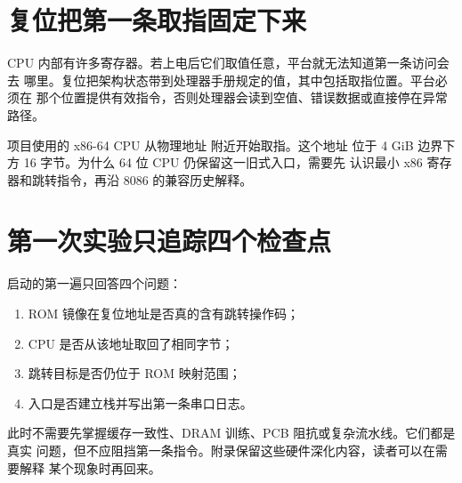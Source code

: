 \section{复位把第一条取指固定下来}

CPU 内部有许多寄存器。若上电后它们取值任意，平台就无法知道第一条访问会去
哪里。复位把架构状态带到处理器手册规定的值，其中包括取指位置。平台必须在
那个位置提供有效指令，否则处理器会读到空值、错误数据或直接停在异常路径。

项目使用的 x86-64 CPU 从物理地址  附近开始取指。这个地址
位于 4 GiB 边界下方 16 字节。为什么 64 位 CPU 仍保留这一旧式入口，需要先
认识最小 x86 寄存器和跳转指令，再沿 8086 的兼容历史解释。

\section{第一次实验只追踪四个检查点}

启动的第一遍只回答四个问题：

\begin{enumerate}[label=\arabic*.]
  \item ROM 镜像在复位地址是否真的含有跳转操作码；
  \item CPU 是否从该地址取回了相同字节；
  \item 跳转目标是否仍位于 ROM 映射范围；
  \item 入口是否建立栈并写出第一条串口日志。
\end{enumerate}

此时不需要先掌握缓存一致性、DRAM 训练、PCB 阻抗或复杂流水线。它们都是真实
问题，但不应阻挡第一条指令。附录保留这些硬件深化内容，读者可以在需要解释
某个现象时再回来。
